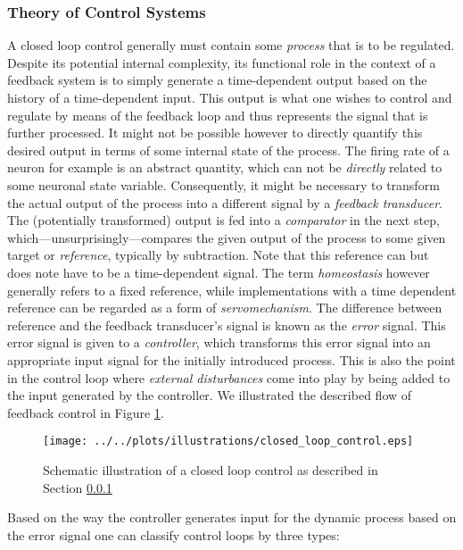 \documentclass[10pt,a4paper]{article}
\begin{document}
\subsubsection{Theory of Control Systems} \label{Control_Sys_Theo_Section}
A closed loop control generally must contain some \emph{process} that is to be regulated. Despite its potential internal complexity, its functional role in the context of a feedback system is to simply generate a time-dependent output based on the history of a time-dependent input. This output is what one wishes to control and regulate by means of the feedback loop and thus represents the signal that is further processed. It might not be possible however to directly quantify this desired output in terms of some internal state of the process. The firing rate of a neuron for example is an abstract quantity, which can not be \emph{directly} related to some neuronal state variable. Consequently, it might be necessary to transform the actual output of the process into a different signal by a \textit{feedback transducer}. The (potentially transformed) output is fed into a \textit{comparator} in the next step, which---unsurprisingly---compares the given output of the process to some given target or \textit{reference}, typically by subtraction. Note that this reference can but does note have to be a time-dependent signal. The term \textit{homeostasis} however generally refers to a fixed reference, while implementations with a time dependent reference can be regarded as a form of \textit{servomechanism}. The difference between reference and the feedback transducer's signal is known as the \textit{error} signal. This error signal is given to a \textit{controller}, which transforms this error signal into an appropriate input signal for the initially introduced process. This is also the point in the control loop where \textit{external disturbances} come into play by being added to the input generated by the controller. We illustrated the described flow of feedback control in Figure \ref{Closed_Loop_Control_Illustration}.
\begin{figure}
\begin{center}
\texttt{[image: ../../plots/illustrations/closed\_loop\_control.eps]}
\end{center}
\caption{Schematic illustration of a closed loop control as described in Section \ref{Control_Sys_Theo_Section}}
\label{Closed_Loop_Control_Illustration}
\end{figure}
Based on the way the controller generates input for the dynamic process based on the error signal one can classify control loops by three types:
\end{document}
